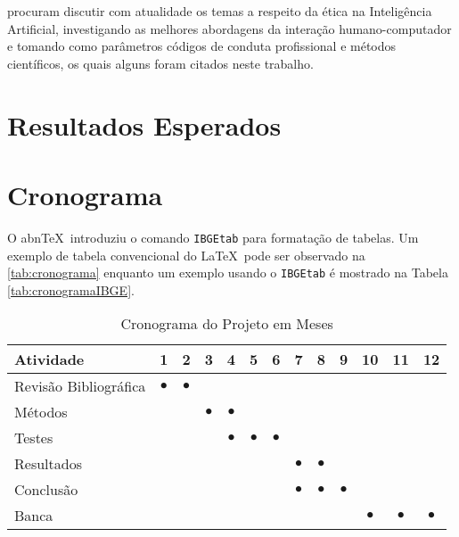 \documentclass[
    12pt,                   %
    openright,              %
    oneside,                %
    a4paper,                %
    sumario=tradicional,    %
    english,                %
    brazil,                 %
    ]{abntex2}
\begin{document}
 procuram discutir com atualidade os temas a respeito da ética na Inteligência Artificial, investigando as melhores abordagens da interação humano-computador e tomando como parâmetros códigos de conduta profissional e métodos científicos, os quais alguns foram citados neste trabalho.

\chapter{Resultados Esperados}\label{sec:resultEsperados}

\chapter{Cronograma}\label{sec:cronograma}
O abn\TeX\ introduziu o comando \texttt{IBGEtab} para formatação de tabelas. Um exemplo de tabela convencional do \LaTeX\ pode ser observado na \autoref{tab:cronograma} enquanto um exemplo usando o \texttt{IBGEtab} é mostrado na Tabela \ref{tab:cronogramaIBGE}.

\begin{table}[htbp]
  \centering
    \caption[Cronograma Normal]{Cronograma do Projeto em Meses}
    \label{tab:cronograma}
    \begin{tabular}{lcccccccccccc} %
    \toprule
    \textbf{Atividade} & \textbf{1} & \textbf{2} & \textbf{3} & \textbf{4} & \textbf{5} & \textbf{6} & \textbf{7} & \textbf{8} & \textbf{9} & \textbf{10} & \textbf{11} & \textbf{12} \\
    \midrule
        Revisão Bibliográfica & $\bullet$ & $\bullet$ & & & & & & & & & & \\
        Métodos & & & $\bullet$ & $\bullet$ & & & & & & & & \\
        Testes & & & & $\bullet$ & $\bullet$ & $\bullet$ & & & & & & \\
        Resultados & & & & & & & $\bullet$ & $\bullet$ & & & & \\
        Conclusão & & & & & & & $\bullet$ & $\bullet$ & $\bullet$ & & & \\
        Banca & & & & & & &&&& $\bullet$ & $\bullet$ & $\bullet$ \\
    \bottomrule
    \end{tabular}%
\end{table}%
\end{document}
